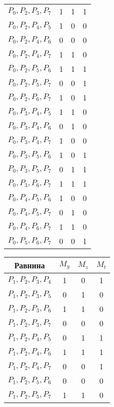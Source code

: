 \documentclass[11pt, oneside]{article}   	%
\begin{document}
\begin{table}
\begin{minipage}[t]{.3\textwidth}
\begin{tabular}{cccc}
$ P_{0}, P_{2}, P_{3}, P_{7} $ & 1 & 1 & 1 \\
$ P_{0}, P_{2}, P_{4}, P_{5} $ & 1 & 0 & 0 \\
$ P_{0}, P_{2}, P_{4}, P_{6} $ & 0 & 0 & 0 \\
$ P_{0}, P_{2}, P_{4}, P_{7} $ & 1 & 1 & 0 \\
$ P_{0}, P_{2}, P_{5}, P_{6} $ & 1 & 1 & 1 \\
$ P_{0}, P_{2}, P_{5}, P_{7} $ & 0 & 0 & 1 \\
$ P_{0}, P_{2}, P_{6}, P_{7} $ & 1 & 0 & 1 \\
$ P_{0}, P_{3}, P_{4}, P_{5} $ & 1 & 1 & 0 \\
$ P_{0}, P_{3}, P_{4}, P_{6} $ & 0 & 1 & 0 \\
$ P_{0}, P_{3}, P_{4}, P_{7} $ & 1 & 0 & 0 \\
$ P_{0}, P_{3}, P_{5}, P_{6} $ & 1 & 0 & 1 \\
$ P_{0}, P_{3}, P_{5}, P_{7} $ & 0 & 1 & 1 \\
$ P_{0}, P_{3}, P_{6}, P_{7} $ & 1 & 1 & 1 \\
$ P_{0}, P_{4}, P_{5}, P_{6} $ & 1 & 0 & 0 \\
$ P_{0}, P_{4}, P_{5}, P_{7} $ & 0 & 1 & 0 \\
$ P_{0}, P_{4}, P_{6}, P_{7} $ & 1 & 1 & 0 \\
$ P_{0}, P_{5}, P_{6}, P_{7} $ & 0 & 0 & 1 \\
\bottomrule
\end{tabular}
\end{minipage} \hfill
\begin{minipage}[t]{.3\textwidth}
\begin{tabular}{cccc}
\toprule
\textbf{Равнина} & \textbf{$M_{y}$} & \textbf{$M_{z}$} & \textbf{$M_{t}$}\\
\midrule
$ P_{1}, P_{2}, P_{3}, P_{4} $ & 1 & 0 & 1 \\
$ P_{1}, P_{2}, P_{3}, P_{5} $ & 0 & 1 & 0 \\
$ P_{1}, P_{2}, P_{3}, P_{6} $ & 1 & 1 & 0 \\
$ P_{1}, P_{2}, P_{3}, P_{7} $ & 0 & 0 & 0 \\
$ P_{1}, P_{2}, P_{4}, P_{5} $ & 0 & 1 & 1 \\
$ P_{1}, P_{2}, P_{4}, P_{6} $ & 1 & 1 & 1 \\
$ P_{1}, P_{2}, P_{4}, P_{7} $ & 0 & 0 & 1 \\
$ P_{1}, P_{2}, P_{5}, P_{6} $ & 0 & 0 & 0 \\
$ P_{1}, P_{2}, P_{5}, P_{7} $ & 1 & 1 & 0 \\

\end{tabular}
\end{minipage}
\end{table}
\end{document}

